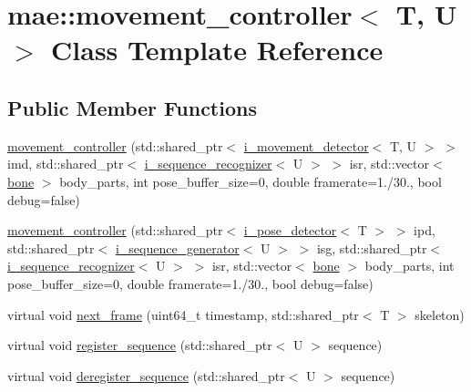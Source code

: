 \hypertarget{classmae_1_1movement__controller}{\section{mae\-:\-:movement\-\_\-controller$<$ T, U $>$ Class Template Reference}
\label{classmae_1_1movement__controller}
}
\subsection*{Public Member Functions}
\begin{DoxyCompactItemize}
\item 
\hyperlink{classmae_1_1movement__controller_a0a6d908fed45b190b0ce24faa879be47}{movement\-\_\-controller} (std\-::shared\-\_\-ptr$<$ \hyperlink{classmae_1_1i__movement__detector}{i\-\_\-movement\-\_\-detector}$<$ T, U $>$ $>$ imd, std\-::shared\-\_\-ptr$<$ \hyperlink{classmae_1_1i__sequence__recognizer}{i\-\_\-sequence\-\_\-recognizer}$<$ U $>$ $>$ isr, std\-::vector$<$ \hyperlink{classmae_1_1bone}{bone} $>$ body\-\_\-parts, int pose\-\_\-buffer\-\_\-size=0, double framerate=1./30., bool debug=false)
\item 
\hyperlink{classmae_1_1movement__controller_ac0ef0a57b48e4fb5f8c28168ea68f9e4}{movement\-\_\-controller} (std\-::shared\-\_\-ptr$<$ \hyperlink{classmae_1_1i__pose__detector}{i\-\_\-pose\-\_\-detector}$<$ T $>$ $>$ ipd, std\-::shared\-\_\-ptr$<$ \hyperlink{classmae_1_1i__sequence__generator}{i\-\_\-sequence\-\_\-generator}$<$ U $>$ $>$ isg, std\-::shared\-\_\-ptr$<$ \hyperlink{classmae_1_1i__sequence__recognizer}{i\-\_\-sequence\-\_\-recognizer}$<$ U $>$ $>$ isr, std\-::vector$<$ \hyperlink{classmae_1_1bone}{bone} $>$ body\-\_\-parts, int pose\-\_\-buffer\-\_\-size=0, double framerate=1./30., bool debug=false)
\item 
virtual void \hyperlink{classmae_1_1movement__controller_a54f9cf019174baf78a5fba4fa2703952}{next\-\_\-frame} (uint64\-\_\-t timestamp, std\-::shared\-\_\-ptr$<$ T $>$ skeleton)
\item 
virtual void \hyperlink{classmae_1_1movement__controller_a67781bb43d01fcecfd4ab7c70c670bb9}{register\-\_\-sequence} (std\-::shared\-\_\-ptr$<$ U $>$ sequence)
\item 
virtual void \hyperlink{classmae_1_1movement__controller_a6b4bf0e71ad1c66fbea6cdae2913ef84}{deregister\-\_\-sequence} (std\-::shared\-\_\-ptr$<$ U $>$ sequence)
\item 

\end{DoxyCompactItemize}
